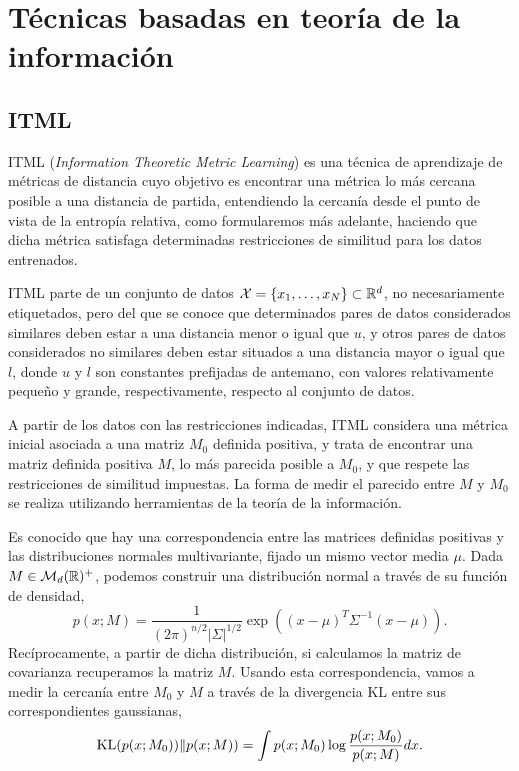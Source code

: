 \documentclass{book}
\begin{document}
\section{Técnicas basadas en teoría de la información}

\subsection{ITML}

ITML (\emph{Information Theoretic Metric Learning}) \cite{itml} es una técnica de aprendizaje de métricas de distancia cuyo objetivo es encontrar una métrica lo más cercana posible a una distancia de partida, entendiendo la cercanía desde el punto de vista de la entropía relativa, como formularemos más adelante, haciendo que dicha métrica satisfaga determinadas restricciones de similitud para los datos entrenados.

ITML parte de un conjunto de datos $\mathcal{X} = \{x_1,\dots,x_N\} \subset \mathbb{R}^d$, no necesariamente etiquetados, pero del que se conoce que determinados pares de datos considerados similares deben estar a una distancia menor o igual que $u$, y otros pares de datos considerados no similares deben estar situados a una distancia mayor o igual que $l$, donde $u$ y $l$ son constantes prefijadas de antemano, con valores relativamente pequeño y grande, respectivamente, respecto al conjunto de datos.

A partir de los datos con las restricciones indicadas, ITML considera una métrica inicial asociada a una matriz $M_0$ definida positiva, y trata de encontrar una matriz definida positiva $M$, lo más parecida posible a $M_0$, y que respete las restricciones de similitud impuestas. La forma de medir el parecido entre $M$ y $M_0$ se realiza utilizando herramientas de la teoría de la información.

Es conocido que hay una correspondencia entre las matrices definidas positivas y las distribuciones normales multivariante, fijado un mismo vector media $\mu$. Dada $M \in \mathcal{M}_d(\mathbb{R})^+$, podemos construir una distribución normal a través de su función de densidad,
\[ p(x;M) = \frac{1}{(2\pi)^{n/2}|\Sigma|^{1/2}}\exp\left( (x-\mu)^T\Sigma^{-1}(x-\mu) \right). \]
Recíprocamente, a partir de dicha distribución, si calculamos la matriz de covarianza recuperamos la matriz $M$. Usando esta correspondencia, vamos a medir la cercanía entre $M_0$ y $M$ a través de la divergencia KL entre sus correspondientes gaussianas,
\[ \operatorname{KL}(p(x;M_0))\|p(x;M)) = \int p(x;M_0)\log\frac{p(x;M_0)}{p(x;M)}dx. \]
\end{document}
